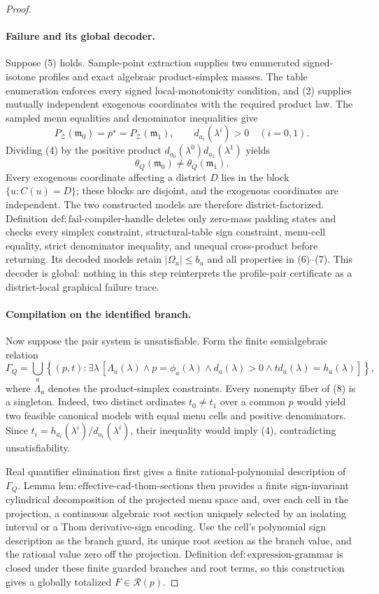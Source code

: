 \documentclass{article}
\begin{document}
\begin{proof}
\paragraph{Failure and its global decoder.}
Suppose (5) holds.  Sample-point extraction supplies two enumerated signed-isotone profiles and exact algebraic product-simplex masses.  The table enumeration enforces every signed local-monotonicity condition, and (2) supplies mutually independent exogenous coordinates with the required product law.  The sampled menu equalities and denominator inequalities give
\[
 P_{\mathcal Z}(\mathfrak m_0)=p^{\star}=P_{\mathcal Z}(\mathfrak m_1),
 \qquad
 d_{a_i}(\lambda^i)>0\quad(i=0,1).
\tag{6}
\]
Dividing (4) by the positive product \(d_{a_0}(\lambda^0)d_{a_1}(\lambda^1)\) yields
\[
 \theta_Q(\mathfrak m_0)\ne\theta_Q(\mathfrak m_1).
\tag{7}
\]
Every exogenous coordinate affecting a district \(D\) lies in the block \(\{u:C(u)=D\}\); these blocks are disjoint, and the exogenous coordinates are independent.  The two constructed models are therefore district-factorized.  Definition \(\mathrm{def:fail\text{-}compiler\text{-}handle}\) deletes only zero-mass padding states and checks every simplex constraint, structural-table sign constraint, menu-cell equality, strict denominator inequality, and unequal cross-product before returning.  Its decoded models retain \(|\Omega_u|\le b_u\) and all properties in (6)--(7).  This decoder is global: nothing in this step reinterprets the profile-pair certificate as a district-local graphical failure trace.

\paragraph{Compilation on the identified branch.}
Now suppose the pair system is unsatisfiable.  Form the finite semialgebraic relation
\[
 \Gamma_Q
 =\bigcup_a\left\{(p,t):\exists\lambda\,
 \left[
 \Lambda_a(\lambda)\wedge p=\phi_a(\lambda)
 \wedge d_a(\lambda)>0
 \wedge t d_a(\lambda)=h_a(\lambda)
 \right]\right\},
\tag{8}
\]
where \(\Lambda_a\) denotes the product-simplex constraints.  Every nonempty fiber of (8) is a singleton.  Indeed, two distinct ordinates \(t_0\ne t_1\) over a common \(p\) would yield two feasible canonical models with equal menu cells and positive denominators.  Since \(t_i=h_{a_i}(\lambda^i)/d_{a_i}(\lambda^i)\), their inequality would imply (4), contradicting unsatisfiability.

Real quantifier elimination first gives a finite rational-polynomial description of \(\Gamma_Q\).  Lemma \(\mathrm{lem:effective\text{-}cad\text{-}thom\text{-}sections}\) then provides a finite sign-invariant cylindrical decomposition of the projected menu space and, over each cell in the projection, a continuous algebraic root section uniquely selected by an isolating interval or a Thom derivative-sign encoding.  Use the cell's polynomial sign description as the branch guard, its unique root section as the branch value, and the rational value zero off the projection.  Definition \(\mathrm{def:expression\text{-}grammar}\) is closed under these finite guarded branches and root terms, so this construction gives a globally totalized \(F\in\mathcal R(p)\).


\end{proof}
\end{document}
